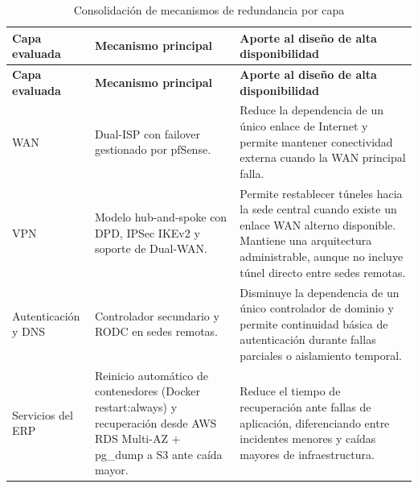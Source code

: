 \documentclass[11pt, a4paper, oneside]{report}
\begin{document}
\begin{xltabular}{\textwidth}{@{}|L{3.3cm}|X|X|@{}}
\caption{Consolidación de mecanismos de redundancia por capa}
\label{tab:consolidacion_plan_redundancia} \\

\parbox[c][1.1cm][c]{\linewidth}{\centering\color{white}\bfseries\small Capa evaluada} &
\parbox[c][1.1cm][c]{\linewidth}{\centering\color{white}\bfseries\small Mecanismo principal} &
\parbox[c][1.1cm][c]{\linewidth}{\centering\color{white}\bfseries\small Aporte al diseño de alta disponibilidad} \\ \hline
\endfirsthead

\parbox[c][1.1cm][c]{\linewidth}{\centering\color{white}\bfseries\small Capa evaluada} &
\parbox[c][1.1cm][c]{\linewidth}{\centering\color{white}\bfseries\small Mecanismo principal} &
\parbox[c][1.1cm][c]{\linewidth}{\centering\color{white}\bfseries\small Aporte al diseño de alta disponibilidad} \\ \hline
\endhead

\hline
\endfoot

{\small WAN} &
{\small Dual-ISP con failover gestionado por pfSense.} &
{\small Reduce la dependencia de un único enlace de Internet y permite mantener conectividad externa cuando la WAN principal falla.} \\ \hline

{\small VPN} &
{\small Modelo hub-and-spoke con DPD, IPSec IKEv2 y soporte de Dual-WAN.} &
{\small Permite restablecer túneles hacia la sede central cuando existe un enlace WAN alterno disponible. Mantiene una arquitectura administrable, aunque no incluye túnel directo entre sedes remotas.} \\ \hline

{\small Autenticación y DNS} &
{\small Controlador secundario y RODC en sedes remotas.} &
{\small Disminuye la dependencia de un único controlador de dominio y permite continuidad básica de autenticación durante fallas parciales o aislamiento temporal.} \\ \hline

{\small Servicios del ERP} &
{\small Reinicio automático de contenedores (Docker restart:always) y recuperación desde AWS RDS Multi-AZ + pg\_dump a S3 ante caída mayor.} &
{\small Reduce el tiempo de recuperación ante fallas de aplicación, diferenciando entre incidentes menores y caídas mayores de infraestructura.} \\ \hline


\end{xltabular}
\end{document}

